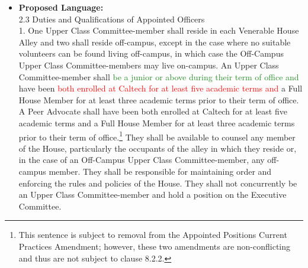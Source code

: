 \documentclass[10pt]{article} %
\newcommand{\add}[1]{\textcolor{ForestGreen}{#1}} %
\newcommand{\del}[1]{\textcolor{red}{#1}} %
\begin{document}
\begin{itemize}
    \item \textbf{Proposed Language:} \\
        2.3 Duties and Qualifications of Appointed Officers \\
        1. One Upper Class Committee-member shall reside in each Venerable House Alley and two shall reside off-campus, except in the case where no suitable volunteers can be found living off-campus, in which case the Off-Campus Upper Class Committee-members may live on-campus. An Upper Class Committee-member shall \add{be a junior or above during their term of office and} have been \del{both enrolled at Caltech for at least five academic terms and} a Full House Member for at least three academic terms prior to their term of office. A Peer Advocate shall have been both enrolled at Caltech for at least five academic terms and a Full House Member for at least three academic terms prior to their term of office.\footnote{This sentence is subject to removal from the Appointed Positions Current Practices Amendment; however, these two amendments are non-conflicting and thus are not subject to clause 8.2.2.} They shall be available to counsel any member of the House, particularly the occupants of the alley in which they reside or, in the case of an Off-Campus Upper Class Committee-member, any off-campus member. They shall be responsible for maintaining order and enforcing the rules and policies of the House. They shall not concurrently be an Upper Class Committee-member and hold a position on the Executive Committee.
\end{itemize}
\end{document}
